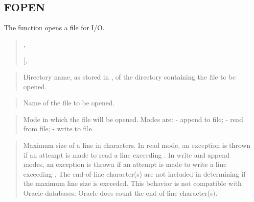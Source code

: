 \documentclass[letterpaper,10pt,english,openany,oneside]{sphinxmanual}
\begin{document}
\subsection{FOPEN}
\label{\detokenize{utl_file:fopen}}
The  function opens a file for I/O.
\begin{quote}

\begin{DUlineblock}{0em}
\item[] ,
\item[] 
\item[] {[}, \sphinxcode{\textless{}max\_linesize\textgreater{} BINARY\_INTEGER {]})}
\end{DUlineblock}
\end{quote}


\begin{quote}

Directory name, as stored in , of the
directory containing the file to be opened.
\end{quote}

\begin{quote}

Name of the file to be opened.
\end{quote}

\begin{quote}

Mode in which the file will be opened. Modes are:  - append to file; 
- read from file;  - write to file.
\end{quote}

\begin{quote}

Maximum size of a line in characters. In read mode, an exception is
thrown if an attempt is made to read a line exceeding .
In write and append modes, an exception is thrown if an attempt is made
to write a line exceeding . The end-of-line character(s)
are not included in determining if the maximum line size is exceeded.
This behavior is not compatible with Oracle databases; Oracle does count
the end-of-line character(s).
\end{quote}
\end{document}

